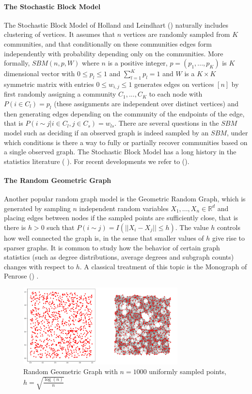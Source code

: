 \documentclass{article}
\begin{document}
\paragraph{The Stochastic Block Model} The Stochastic Block Model of Holland and Leindhart (\cite{Holland1983StochasticBF}) naturally includes clustering of vertices. It assumes that $n$ vertices are randomly sampled from $K$
communities, and that conditionally on these communities edges form independently with probability depending only on the communities. More formally, $SBM(n,p,W)$ where $n$ is a positive integer, $p=(p_1,...,p_K)$ is $K$ dimensional vector with $0\leq p_l\leq 1$ and $\sum_{l=1}^Kp_l=1$ and $W$ is a $K\times K$ symmetric matrix with entries $0\leq w_{i,j}\leq 1$ generates edges on vertices $[n]$ by first randomly assigning a community $C_1,...,C_K$ to each node with $P(i\in C_l)=p_l$ (these assignments are independent over distinct vertices) and then generating edges depending on the community of the endpoints of the edge, that is $P(i\sim j| i\in C_l,j\in C_s)=w_{ls}$. There are several questions in the $SBM$ model such as deciding if an observed graph is indeed sampled by an $SBM$, under which conditions is there a way to fully or partially recover communities based on a single observed graph. The Stochastic Block Model has a long history in the statistics literature (  \cite{Snijders}). For recent developments we refer to (\cite{Abbe}).

\paragraph{The Random Geometric Graph} Another popular random graph model is the Geometric Random Graph, which is generated by sampling $n$ independent random variables $X_1,...,X_n\in\mathbb{R}^d$ and placing edges between nodes if the sampled points are sufficiently close, that is there is $h>0$ such that $P(i\sim j)=I(||X_i-X_j||\leq h)$. The value $h$ controls how well connected the graph is, in the sense that smaller values of $h$ give rise to sparser graphs. It is common to study how the behavior of certain graph statistics (such as degree distributions, average degrees and  subgraph counts) changes with respect to $h$. A classical treatment of this topic is the Monograph of Penrose (\cite{Penrose2003RandomGG})
.

\begin{figure}
    \centering
    \includegraphics[width=0.75\textwidth]{sparse_rgg.png}
    \caption{Random Geometric Graph with $n=1000$ uniformly sampled points, $h=\sqrt{\frac{\log(n)}{n}}$}
    \label{Rgg_fig}
\end{figure}
\end{document}
